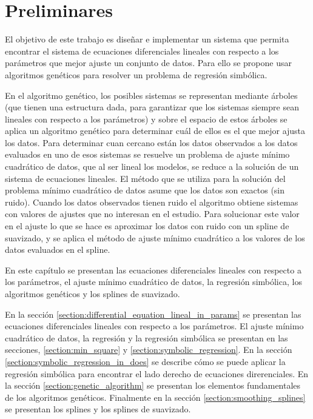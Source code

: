 \chapter{Preliminares}\label{chapter:preliminaries}

El objetivo de este trabajo es diseñar e implementar un sistema que permita encontrar el sistema de ecuaciones diferenciales lineales con respecto a los parámetros que mejor ajuste un conjunto de datos. Para ello se propone usar algoritmos genéticos para resolver un problema de regresión simbólica.

En el algoritmo genético, los posibles sistemas se representan mediante árboles (que tienen una estructura dada, para garantizar que los sistemas siempre sean lineales con respecto a los parámetros) y sobre el espacio de estos árboles se aplica un algoritmo genético para determinar cuál de ellos es el que mejor ajusta los datos. Para determinar cuan cercano están los datos observados a los datos evaluados en uno de esos sistemas se resuelve un problema de ajuste mínimo cuadrático de datos, que al ser lineal los modelos, se reduce a la solución de un sistema de ecuaciones lineales. El método que se utiliza para la solución del problema mínimo cuadrático de datos asume que los datos son exactos (sin ruido). Cuando los datos observados tienen ruido el algoritmo obtiene sistemas con valores de ajustes que no interesan en el estudio. Para solucionar este valor en el ajuste lo que se hace es aproximar los datos con ruido con un spline de suavizado, y se aplica el método de ajuste mínimo cuadrático a los valores de los datos evaluados en el spline.

En este capítulo se presentan las ecuaciones diferenciales lineales con respecto a los parámetros, el ajuste mínimo cuadrático de datos, la regresión simbólica, los algoritmos genéticos y los splines de suavizado.

En la sección \ref{section:differential_equation_lineal_in_params} se presentan las ecuaciones diferenciales lineales con respecto a los parámetros. El ajuste mínimo cuadrático de datos, la regresión y la regresión simbólica se presentan en las secciones, \ref{section:min_square} y \ref{section:symbolic_regression}. En la sección \ref{section:symbolic_regression_in_does} se describe cómo se puede aplicar la regresión simbólica para encontrar el lado derecho de ecuaciones direrenciales. En la sección \ref{section:genetic_algorithm} se presentan los elementos fundamentales de los algoritmos genéticos. Finalmente en la sección \ref{section:smoothing_splines} se presentan los splines y los splines de suavizado.

